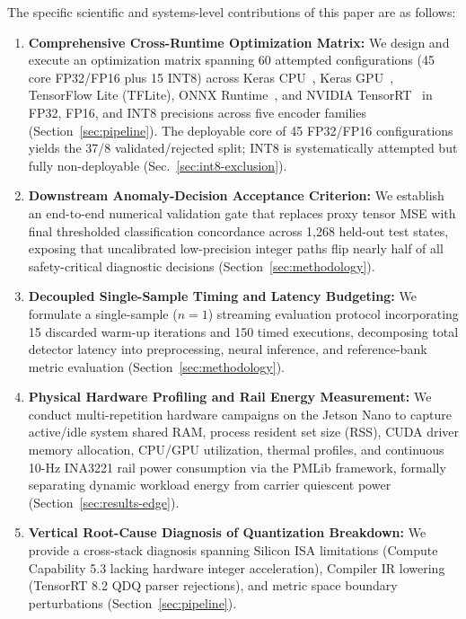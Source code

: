 \documentclass[11pt,a4paper]{article}
\begin{document}
The specific scientific and systems-level contributions of this paper are as follows:
\begin{enumerate}
    \item \textbf{Comprehensive Cross-Runtime Optimization Matrix:} We design and execute an optimization matrix spanning 60 attempted configurations (45 core FP32/FP16 plus 15 INT8) across Keras CPU~\cite{chollet2015keras}, Keras GPU~\cite{abadi2016tensorflow}, TensorFlow Lite (TFLite), ONNX Runtime~\cite{bai2019onnx}, and NVIDIA TensorRT~\cite{nvidia2020tensorrt} in FP32, FP16, and INT8 precisions across five encoder families (Section~\ref{sec:pipeline}). The deployable core of 45 FP32/FP16 configurations yields the 37/8 validated/rejected split; INT8 is systematically attempted but fully non-deployable (Sec.~\ref{sec:int8-exclusion}).
    \item \textbf{Downstream Anomaly-Decision Acceptance Criterion:} We establish an end-to-end numerical validation gate that replaces proxy tensor MSE with final thresholded classification concordance across 1,268 held-out test states, exposing that uncalibrated low-precision integer paths flip nearly half of all safety-critical diagnostic decisions (Section~\ref{sec:methodology}).
    \item \textbf{Decoupled Single-Sample Timing and Latency Budgeting:} We formulate a single-sample ($n=1$) streaming evaluation protocol incorporating 15 discarded warm-up iterations and 150 timed executions, decomposing total detector latency into preprocessing, neural inference, and reference-bank metric evaluation (Section~\ref{sec:methodology}).
    \item \textbf{Physical Hardware Profiling and Rail Energy Measurement:} We conduct multi-repetition hardware campaigns on the Jetson Nano to capture active/idle system shared RAM, process resident set size (RSS), CUDA driver memory allocation, CPU/GPU utilization, thermal profiles, and continuous 10-Hz INA3221 rail power consumption via the PMLib framework, formally separating dynamic workload energy from carrier quiescent power (Section~\ref{sec:results-edge}).
    \item \textbf{Vertical Root-Cause Diagnosis of Quantization Breakdown:} We provide a cross-stack diagnosis spanning Silicon ISA limitations (Compute Capability 5.3 lacking hardware integer acceleration), Compiler IR lowering (TensorRT 8.2 QDQ parser rejections), and metric space boundary perturbations (Section~\ref{sec:pipeline}).
\end{enumerate}
\end{document}
